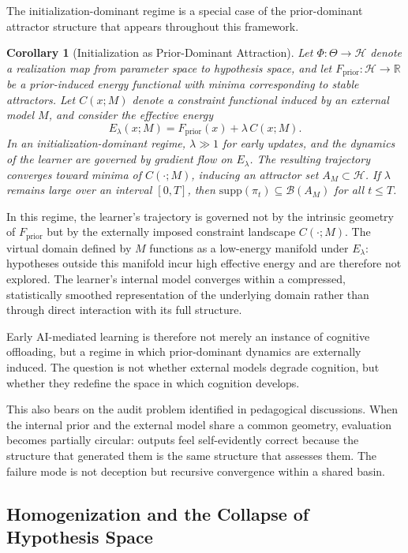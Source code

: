 \documentclass[11pt,a4paper]{article}
\theoremstyle{plain}
\newtheorem{corollary}[theorem]{Corollary}
\theoremstyle{definition}
\theoremstyle{remark}
\begin{document}
The initialization-dominant regime is a special case of the prior-dominant
attractor structure that appears throughout this framework.

\begin{corollary}[Initialization as Prior-Dominant Attraction]
Let $\Phi: \Theta \to \mathcal{H}$ denote a realization map from parameter space
to hypothesis space, and let $F_{\mathrm{prior}} : \mathcal{H} \to \mathbb{R}$
be a prior-induced energy functional with minima corresponding to stable
attractors. Let $C(x; M)$ denote a constraint functional induced by an external
model $M$, and consider the effective energy
\[
  E_\lambda(x; M) = F_{\mathrm{prior}}(x) + \lambda\, C(x; M).
\]
In an initialization-dominant regime, $\lambda \gg 1$ for early updates, and the
dynamics of the learner are governed by gradient flow on $E_\lambda$. The
resulting trajectory converges toward minima of $C(\cdot; M)$, inducing an
attractor set $A_M \subset \mathcal{H}$. If $\lambda$ remains large over an
interval $[0,T]$, then $\mathrm{supp}(\pi_t) \subseteq \mathcal{B}(A_M)$ for
all $t \leq T$.
\end{corollary}

In this regime, the learner's trajectory is governed not by the intrinsic
geometry of $F_{\mathrm{prior}}$ but by the externally imposed constraint
landscape $C(\cdot; M)$. The virtual domain defined by $M$ functions as a
low-energy manifold under $E_\lambda$: hypotheses outside this manifold incur
high effective energy and are therefore not explored. The learner's internal
model converges within a compressed, statistically smoothed representation of
the underlying domain rather than through direct interaction with its full
structure.

Early AI-mediated learning is therefore not merely an instance of cognitive
offloading, but a regime in which prior-dominant dynamics are externally induced.
The question is not whether external models degrade cognition, but whether they
redefine the space in which cognition develops.

This also bears on the audit problem identified in pedagogical discussions. When
the internal prior and the external model share a common geometry, evaluation
becomes partially circular: outputs feel self-evidently correct because the
structure that generated them is the same structure that assesses them. The
failure mode is not deception but recursive convergence within a shared basin.

\subsection{Homogenization and the Collapse of Hypothesis Space}
\end{document}
